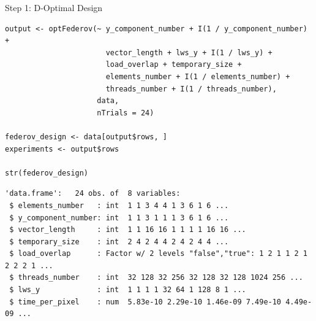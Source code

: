 \documentclass[10pt, compress, aspectratio=169, xcolor={table,usenames,dvipsnames}]{beamer}
\begin{document}
\begin{frame}[fragile,label={sec:org6c41eef}]{Step 1: D-Optimal Design}
 \scriptsize
\lstset{language=r,label= ,caption= ,captionpos=b,numbers=none}
\begin{lstlisting}
output <- optFederov(~ y_component_number + I(1 / y_component_number) +
                       vector_length + lws_y + I(1 / lws_y) +
                       load_overlap + temporary_size +
                       elements_number + I(1 / elements_number) +
                       threads_number + I(1 / threads_number),
                     data,
                     nTrials = 24)

federov_design <- data[output$rows, ]
experiments <- output$rows

str(federov_design)
\end{lstlisting}

\begin{verbatim}
'data.frame':	24 obs. of  8 variables:
 $ elements_number   : int  1 1 3 4 4 1 3 6 1 6 ...
 $ y_component_number: int  1 1 3 1 1 1 3 6 1 6 ...
 $ vector_length     : int  1 1 16 16 1 1 1 1 16 16 ...
 $ temporary_size    : int  2 4 2 4 4 2 4 2 4 4 ...
 $ load_overlap      : Factor w/ 2 levels "false","true": 1 2 1 1 2 1 2 2 2 1 ...
 $ threads_number    : int  32 128 32 256 32 128 32 128 1024 256 ...
 $ lws_y             : int  1 1 1 1 32 64 1 128 8 1 ...
 $ time_per_pixel    : num  5.83e-10 2.29e-10 1.46e-09 7.49e-10 4.49e-09 ...
\end{verbatim}

\normalsize
\end{frame}
\end{document}
